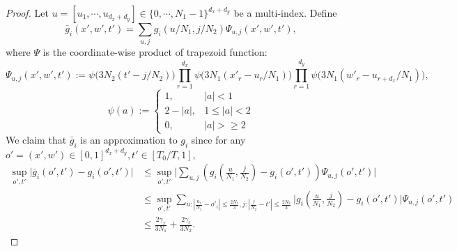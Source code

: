 \documentclass[11pt]{article}
\numberwithin{equation}{section}
\begin{document}
\begin{proof}
    Let $u=[u_1,\cdots,u_{d_x+d_y}]\in\{0,\cdots,N_1-1\}^{d_x+d_y}$ be a multi-index. Define
    \begin{equation}\label{eq:def_g_bar}
        \bar{g}_i(x',w',t')=\sum_{u,j}g_i(u/N_1,j/N_2)\Psi_{u,j}(x',w',t'),
    \end{equation}
    where $\Psi$ is the coordinate-wise product of trapezoid function:
    \begin{equation}
        \Psi_{u,j}(x',w',t'):=\psi\big(3N_2(t'-j/N_2)\big)\prod_{r=1}^{d_x}\psi\big(3N_1(x'_r-u_r/N_1)\big)\prod_{r=1}^{d_y}\psi\big(3N_1(w'_r-u_{r+d_x}/N_1)\big),
    \end{equation}
    \begin{equation}
        \psi(a):=\left\{
            \begin{array}{ll}
                1, & |a|< 1 \\
                2-|a|, & 1\leq |a| < 2 \\
                0, & |a|>\geq 2
            \end{array}
        \right.
    \end{equation}
    We claim that $\bar{g}_i$ is an approximation to $g_i$ since for any $o'=(x',w')\in[0,1]^{d_x+d_y},t'\in[T_0/T,1]$,
    \begin{equation}
        \begin{aligned}
            \sup_{o',t'}\Big|\bar{g}_i(o',t')-g_i(o',t')|
            &\leq \sup_{o',t'}\Big|\sum_{u,j}(g_i(\frac{u}{N_1},\frac{j}{N_2})-g_i(o',t'))\Psi_{u,j}(o',t')\Big| \\
            &\leq \sup_{o',t'} \sum_{u:|\frac{u_i}{N_1}-o'_i|\leq \frac{2N_1}{3},j:|\frac{j}{N_2}-t'|\leq \frac{2N_2}{3}}\Big|g_i(\frac{u}{N_1},\frac{j}{N_2})-g_i(o',t')\Big|\Psi_{u,j}(o',t') \\
            &\leq \frac{2\gamma_x}{3N_1}+\frac{2\gamma_t}{3N_2}.
        \end{aligned}
    \end{equation}
    

\end{proof}
\end{document}
